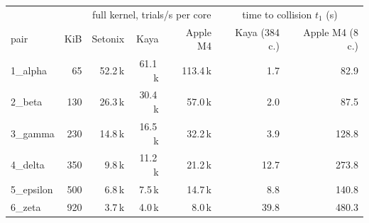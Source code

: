 \begin{tabular}{lrrrrrr}
\toprule
 & & \multicolumn{3}{c}{full kernel, trials/s per core} & \multicolumn{2}{c}{time to collision $t_1$ (s)}\\
pair & KiB & Setonix & Kaya & Apple M4 & Kaya (384 c.) & Apple M4 (8 c.)\\
\midrule
1\_alpha & 65 & 52.2\,k & 61.1\,k & 113.4\,k & 1.7 & 82.9\\
2\_beta & 130 & 26.3\,k & 30.4\,k & 57.0\,k & 2.0 & 87.5\\
3\_gamma & 230 & 14.8\,k & 16.5\,k & 32.2\,k & 3.9 & 128.8\\
4\_delta & 350 & 9.8\,k & 11.2\,k & 21.2\,k & 12.7 & 273.8\\
5\_epsilon & 500 & 6.8\,k & 7.5\,k & 14.7\,k & 8.8 & 140.8\\
6\_zeta & 920 & 3.7\,k & 4.0\,k & 8.0\,k & 39.8 & 480.3\\
\bottomrule
\end{tabular}
